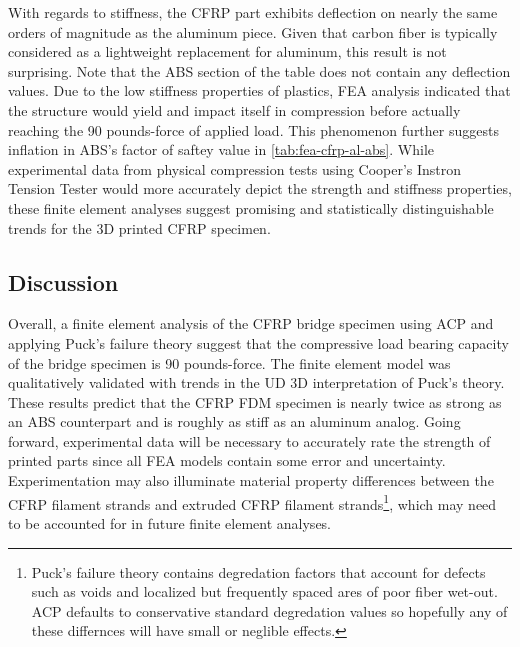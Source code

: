 With regards to stiffness, the CFRP part exhibits deflection on nearly the same orders of magnitude as the aluminum piece. Given that carbon fiber is typically considered as a lightweight replacement for aluminum, this result is not surprising. Note that the ABS section of the table does not contain any deflection values. Due to the low stiffness properties of plastics, FEA analysis indicated that the structure would yield and impact itself in compression before actually reaching the 90 pounds-force of applied load. This phenomenon further suggests inflation in ABS's factor of saftey value in \ref{tab:fea-cfrp-al-abs}. While experimental data from physical compression tests using Cooper's Instron Tension Tester would more accurately depict the strength and stiffness properties, these finite element analyses suggest promising and statistically distinguishable trends for the 3D printed CFRP specimen.

\subsection{Discussion}

\indent

Overall, a finite element analysis of the CFRP bridge specimen using ACP and applying Puck's failure theory suggest that the compressive load bearing capacity of the bridge specimen is 90 pounds-force. The finite element model was qualitatively validated with trends in the UD 3D interpretation of Puck's theory. These results predict that the CFRP FDM specimen is nearly twice as strong as an ABS counterpart and is roughly as stiff as an aluminum analog. Going forward, experimental data will be necessary to accurately rate the strength of printed parts since all FEA models contain some error and uncertainty. Experimentation may also illuminate material property differences between the CFRP filament strands and extruded CFRP filament strands\footnote{Puck's failure theory contains degredation factors that account for defects such as voids and localized but frequently spaced ares of poor fiber wet-out. ACP defaults to conservative standard degredation values so hopefully any of these differnces will have small or neglible effects.}, which may need to be accounted for in future finite element analyses.

\clearpage

